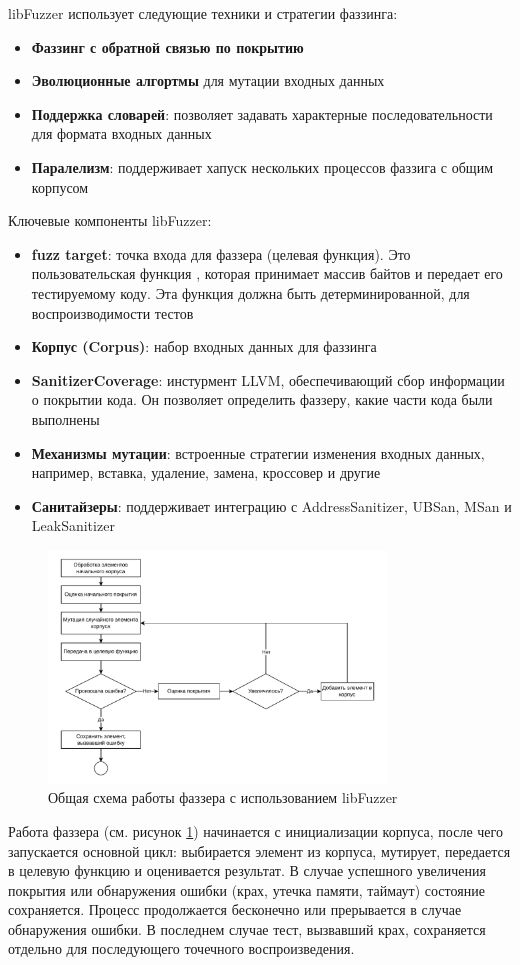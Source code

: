 libFuzzer использует следующие техники и стратегии фаззинга:
\begin{itemize}
	\item \textbf{Фаззинг с обратной связью по покрытию}
	\item \textbf{Эволюционные алгортмы} для мутации входных данных
	\item \textbf{Поддержка словарей}: позволяет задавать характерные последовательности для формата входных данных
	\item \textbf{Паралелизм}: поддерживает хапуск нескольких процессов фаззига с общим корпусом
\end{itemize}

Ключевые компоненты libFuzzer:
\begin{itemize}
	\item \textbf{fuzz target}: точка входа для фаззера (целевая функция). Это пользовательская функция , которая принимает массив байтов и передает его тестируемому коду. Эта функция должна быть детерминированной, для воспроизводимости тестов
	\item \textbf{Корпус (Corpus)}: набор входных данных для фаззинга
	\item \textbf{SanitizerCoverage}: инстурмент LLVM, обеспечивающий сбор информации о покрытии кода. Он позволяет определить фаззеру, какие части кода были выполнены
	\item \textbf{Механизмы мутации}: встроенные стратегии изменения входных данных, например, вставка, удаление, замена, кроссовер и другие
	\item \textbf{Санитайзеры}: поддерживает интеграцию с AddressSanitizer, UBSan, MSan и LeakSanitizer
\end{itemize}
\begin{figure}[htbp]
	\centering %
	\includegraphics[width=0.8\textwidth]{Piclibfuzz.pdf} %
	\caption{Общая схема работы фаззера с использованием libFuzzer} %
	\label{intro:libfuzz} %
\end{figure}
Работа фаззера (см. рисунок \ref{intro:libfuzz}) начинается с инициализации корпуса, после чего запускается основной цикл: выбирается элемент из корпуса, мутирует, передается в целевую функцию и оценивается результат. В случае успешного увеличения покрытия или обнаружения ошибки (крах, утечка памяти, таймаут) состояние сохраняется. Процесс продолжается бесконечно или прерывается в случае обнаружения ошибки. В последнем случае тест, вызвавший крах, сохраняется отдельно для последующего точечного воспроизведения.

